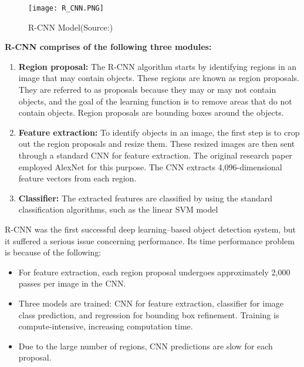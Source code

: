     \begin{figure}[H]
         \centering
         \texttt{[image: R\_CNN.PNG]}
         \caption{R-CNN Model(Source:\cite{girshick2014rich})}
            \label{fig: R-CNN Model}
    \end{figure}
\textbf{R-CNN comprises of the following three modules:}\\
        \begin{enumerate}
            \item \textbf{Region proposal: } The R-CNN algorithm starts by identifying regions in an image that may contain objects. These regions are known as region proposals. They are referred to as proposals because they may or may not contain objects, and the goal of the learning function is to remove areas that do not contain objects. Region proposals are bounding boxes around the objects.
            \item \textbf{Feature extraction:} To identify objects in an image, the first step is to crop out the region proposals and resize them. These resized images are then sent through a standard CNN for feature extraction. The original research paper employed AlexNet for this purpose. The CNN extracts 4,096-dimensional feature vectors from each region.
            \item  \textbf{Classifier: } The extracted features are classified by using the standard classification algorithms, such as the linear SVM model 
        \end{enumerate}
R-CNN was the first successful deep learning–based object detection system, but it suffered a serious issue concerning performance. Its time performance problem is because of the following:
    \begin{itemize}
         \item For feature extraction, each region proposal undergoes approximately 2,000 passes per image in the CNN.
        \item Three models are trained: CNN for feature extraction, classifier for image class prediction, and regression for bounding box refinement. Training is compute-intensive, increasing computation time.
        \item Due to the large number of regions, CNN predictions are slow for each proposal.
    \end{itemize}
        
